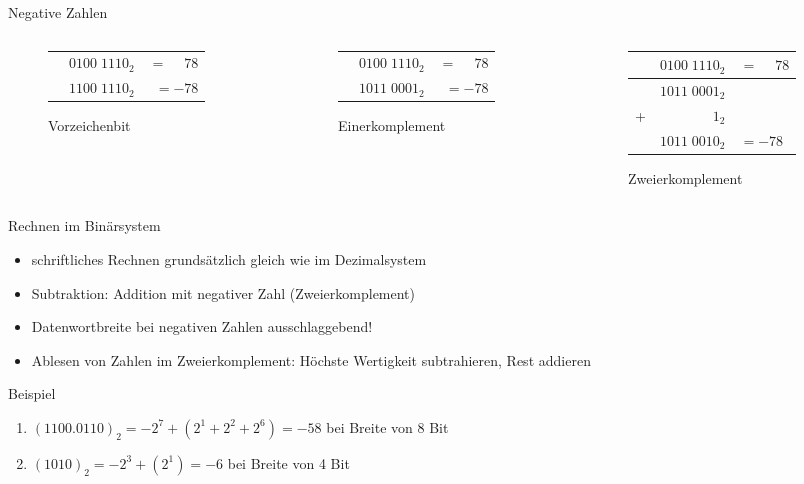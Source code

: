\documentclass[
  german,            %
  aspectratio=169,    %
]{tumbeamer}
\begin{document}
\begin{frame}[c]{Negative Zahlen}{}
	\begin{columns}[c]
		\begin{column}{0.3\textwidth}
			\begin{figure}
				\begin{tabular}{crr}
					&$0100\;1110_2$ & $=\phantom{-}78$ \\
					&\textcolor{TUMBlue}{$1$}$100\;1110_2$ & $=-78$
				\end{tabular}
				\caption{Vorzeichenbit}
			\end{figure}
		\end{column}
		\begin{column}{0.3\textwidth}
			\begin{figure}
				\begin{tabular}{crr}
					&$0100\;1110_2$ & $=\phantom{-}78$ \\
					&$1011\;0001_2$ &$=-78$
				\end{tabular}
				\caption{Einerkomplement}
			\end{figure}
		\end{column}
		\begin{column}{0.3\textwidth}
			\begin{figure}
				\begin{tabular}{rrl}
					&$0100\;1110_2$ & $=\phantom{-}78$ \\\hline
					&$1011\;0001_2$ &\\
					+ & $1_2$& \\\hline
					&$1011\;0010_2$ &$=-78$
				\end{tabular}
				\caption{Zweierkomplement}
			\end{figure}
		\end{column}
	\end{columns}
\end{frame}

\begin{frame}[c]{Rechnen im Binärsystem}{}
	\begin{itemize}
		\item schriftliches Rechnen grundsätzlich gleich wie im Dezimalsystem
		\item Subtraktion: Addition mit negativer Zahl (Zweierkomplement)
		\item Datenwortbreite bei negativen Zahlen ausschlaggebend!
		\item Ablesen von Zahlen im Zweierkomplement: Höchste Wertigkeit subtrahieren, Rest addieren
	\end{itemize}
	\vfill{}
	\begin{block}{Beispiel}
		\begin{enumerate}
			\item $(1100.0110)_2 = -2^7+(2^1+2^2+2^6)=-58$ bei Breite von 8 Bit
			\item $(1010)_2 = -2^3 + (2^1) = -6$ bei Breite von 4 Bit
		\end{enumerate}
	\end{block}
\end{frame}
\end{document}
